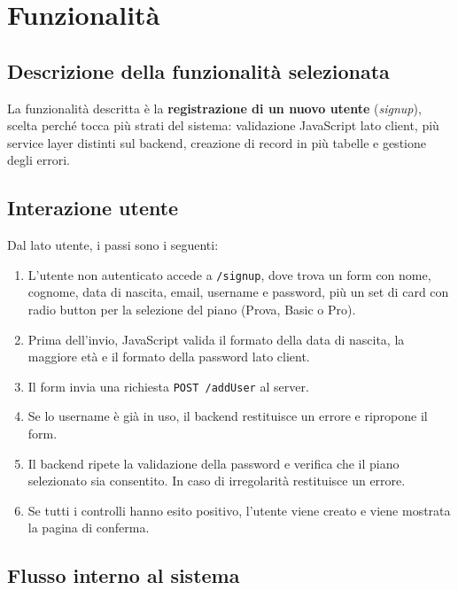 \section{Funzionalità}

\subsection{Descrizione della funzionalità selezionata}
La funzionalità descritta è la \textbf{registrazione di un nuovo utente} (\textit{signup}), scelta perché tocca più strati del sistema: validazione JavaScript lato client, più service layer distinti sul backend, creazione di record in più tabelle e gestione degli errori.

\subsection{Interazione utente}
Dal lato utente, i passi sono i seguenti:

\begin{enumerate}
  \item L'utente non autenticato accede a \texttt{/signup}, dove trova un form
    con nome, cognome, data di nascita, email, username e password, più un set
    di card con radio button per la selezione del piano (Prova, Basic o Pro).
  \item Prima dell'invio, JavaScript valida il formato della data di nascita, la maggiore età e il formato della password lato client.
  \item Il form invia una richiesta \texttt{POST /addUser} al server.
  \item Se lo username è già in uso, il backend restituisce un errore e ripropone il form.
  \item Il backend ripete la validazione della password e verifica che il piano selezionato sia consentito. In caso di irregolarità restituisce un errore.
  \item Se tutti i controlli hanno esito positivo, l'utente viene creato e viene mostrata la pagina di conferma.
\end{enumerate}

\subsection{Flusso interno al sistema}

